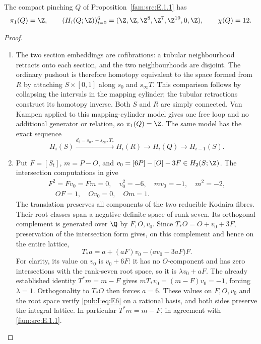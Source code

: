 \begin{proposition}\hypertarget{tag-01R4}{}\label{fam:src:E.1.4}\label{fam:st:E.1.4}

The compact pinching $Q$ of Proposition~\ref{fam:src:E.1.1} has
\[
 \pi_1(Q)=\Z,\qquad
 (H_i(Q;\Z))_{i=0}^6
   =(\Z,\Z,\Z^8,\Z^7,\Z^{10},0,\Z),\qquad\chi(Q)=12.
\]

\end{proposition}



\begin{proof}
\begin{enumerate}[label=\arabic*.,leftmargin=*]
\item The two section embeddings are cofibrations: a tubular neighbourhood
retracts onto each section, and the two neighbourhoods are disjoint.
The ordinary pushout is therefore homotopy equivalent to the space
formed from $R$ by attaching $S\times[0,1]$ along
$s_0$ and $s_\infty T$. This comparison follows by collapsing the
intervals in the mapping cylinder; the tubular retractions construct
its homotopy inverse. Both $S$ and $R$ are simply connected. Van
Kampen applied to this mapping-cylinder model gives one free loop
and no additional generator or relation, so $\pi_1(Q)=\Z$.
The same model has the exact sequence
\begin{equation}
 H_i(S)\xrightarrow{d_i=s_{0*}-s_{\infty*}T_*}H_i(R)
 \longrightarrow H_i(Q)\longrightarrow H_{i-1}(S).
\label{pub:I:eq:E4}
\end{equation}

\item Put $F=[S_t]$, $m=P-O$, and
$v_0=[6P]-[O]-3F\in H_2(S;\Z)$. The intersection computations in
\cite[Lemma~2.1, pp.~3--4]{Engel2026} give
\label{layout:I:2}
\begin{equation}
\begin{gathered}
F^2=Fv_0=Fm=0,\quad v_0^2=-6,\quad mv_0=-1,\quad m^2=-2,
 \\
\quad OF=1,\quad Ov_0=0,\quad Om=1.
\end{gathered}
\label{pub:I:eq:E5}
\end{equation}
The translation preserves all components of the two reducible
Kodaira fibres. Their root classes span a negative definite space of
rank seven. Its orthogonal complement is generated over $\Q$ by
$F,O,v_0$. Since $T_*O=O+v_0+3F$, preservation of the intersection
form gives, on this complement and hence on the entire lattice,
\begin{equation}
 T_*a=a+(aF)v_0-\bigl(av_0-3aF\bigr)F.
\label{pub:I:eq:E6}
\end{equation}
For clarity, its value on $v_0$ is $v_0+6F$: it has no $O$-component
and has zero intersections with the rank-seven root space, so it is
$\lambda v_0+aF$. The already established identity $T^*m=m-F$ gives
$mT_*v_0=(m-F)v_0=-1$, forcing $\lambda=1$. Orthogonality to
$T_*O$ then forces $a=6$. These
values on $F,O,v_0$ and the root space verify \eqref{pub:I:eq:E6} on a rational basis,
and both sides preserve the integral lattice. In particular
$T^*m=m-F$, in agreement with \ref{fam:src:E.1.1}.


\end{enumerate}
\end{proof}
